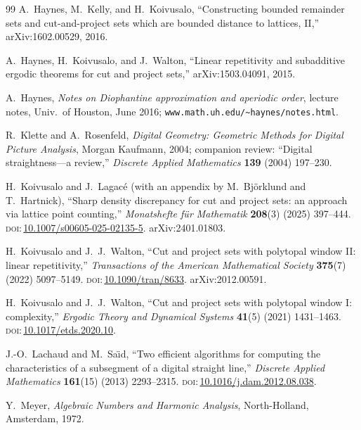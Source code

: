 \documentclass[11pt]{article}
\theoremstyle{plain}
\theoremstyle{remark}
\begin{document}
\begin{thebibliography}{99}
A.~Haynes, M.~Kelly, and H.~Koivusalo,
``Constructing bounded remainder sets and cut-and-project sets which are bounded
distance to lattices, II,''
arXiv:1602.00529, 2016.

A.~Haynes, H.~Koivusalo, and J.~Walton,
``Linear repetitivity and subadditive ergodic theorems for cut and project sets,''
arXiv:1503.04091, 2015.

A.~Haynes,
\emph{Notes on Diophantine approximation and aperiodic order},
lecture notes, Univ.\ of Houston, June 2016;
\texttt{www.math.uh.edu/\textasciitilde{}haynes/notes.html}.

R.~Klette and A.~Rosenfeld,
\emph{Digital Geometry: Geometric Methods for Digital Picture Analysis},
Morgan Kaufmann, 2004;
companion review: ``Digital straightness---a review,''
\emph{Discrete Applied Mathematics} \textbf{139} (2004) 197--230.

H.~Koivusalo and J.~Lagac\'e (with an appendix by M.~Bj\"orklund and T.~Hartnick),
``Sharp density discrepancy for cut and project sets: an approach via lattice point
counting,''
\emph{Monatshefte f\"ur Mathematik} \textbf{208}(3) (2025) 397--444.
\textsc{doi}:\,\href{https://doi.org/10.1007/s00605-025-02135-5}{10.1007/s00605-025-02135-5}.
arXiv:2401.01803.

H.~Koivusalo and J.~J.~Walton,
``Cut and project sets with polytopal window II: linear repetitivity,''
\emph{Transactions of the American Mathematical Society} \textbf{375}(7) (2022)
5097--5149.
\textsc{doi}:\,\href{https://doi.org/10.1090/tran/8633}{10.1090/tran/8633}.
arXiv:2012.00591.

H.~Koivusalo and J.~J.~Walton,
``Cut and project sets with polytopal window I: complexity,''
\emph{Ergodic Theory and Dynamical Systems} \textbf{41}(5) (2021) 1431--1463.
\textsc{doi}:\,\href{https://doi.org/10.1017/etds.2020.10}{10.1017/etds.2020.10}.

J.-O.~Lachaud and M.~Sa\"{\i}d,
``Two efficient algorithms for computing the characteristics of a subsegment
of a digital straight line,''
\emph{Discrete Applied Mathematics} \textbf{161}(15) (2013) 2293--2315.
\textsc{doi}:\,\href{https://doi.org/10.1016/j.dam.2012.08.038}{10.1016/j.dam.2012.08.038}.

Y.~Meyer,
\emph{Algebraic Numbers and Harmonic Analysis},
North-Holland, Amsterdam, 1972.


\end{thebibliography}
\end{document}
